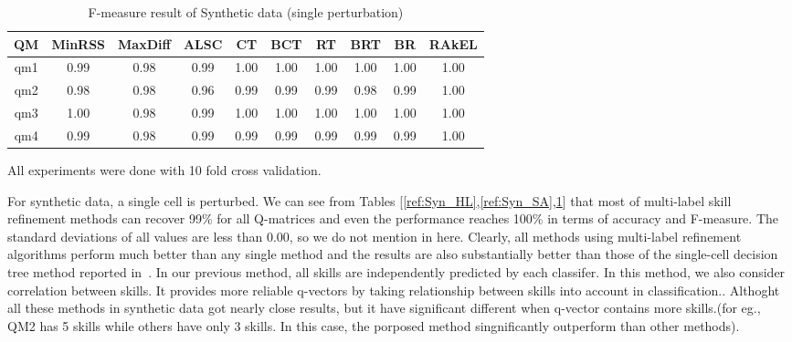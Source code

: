 \documentclass[11pt]{article}
\begin{document}
\begin {table}[h]
\scriptsize
\centering
\begin{tabular}{c|c|c|c|c|c|c|c|c|c}	
	\hline\hline	
QM & MinRSS & MaxDiff & ALSC & CT & BCT & RT & BRT & BR & RAkEL \\ \hline
qm1 & 0.99 & 0.98 & 0.99 & 1.00 & 1.00 & 1.00 & 1.00 & 1.00 & 1.00 \\
qm2 & 0.98 & 0.98 & 0.96 & 0.99 & 0.99 & 0.99 & 0.98 & 0.99 & 1.00 \\
qm3 & 1.00 & 0.98 & 0.99 & 1.00 & 1.00 & 1.00 & 1.00 & 1.00 & 1.00 \\
qm4 & 0.99 & 0.98 & 0.99 & 0.99 & 0.99 & 0.99 & 0.99 & 0.99 & 1.00 \\
\hline\hline
\end{tabular}
\caption {F-measure result of Synthetic data (single perturbation)} \label{ref:Syn_FM}
\end{table}

All experiments were done with 10 fold cross validation.

 
 For synthetic data, a single cell is perturbed. We can see from Tables [\ref{ref:Syn_HL},\ref{ref:Syn_SA},\ref{ref:Syn_FM}] that most of multi-label skill refinement methods can recover 99\% for all
Q-matrices and even the performance reaches 100\% in terms of accuracy
and F-measure. The standard deviations of all values are less than 0.00, so we do not mention in here. Clearly, all methods using multi-label refinement algorithms perform much better than any single method and the results are also substantially better than those of the single-cell decision tree method reported in~\cite{desmarais2015combining}. In our previous method, all skills are independently predicted by each classifer. In this method, we also consider correlation between skills. It provides more reliable q-vectors by taking relationship between skills into account in classification.. Althoght all these methods in synthetic data got nearly close results, but it have significant different when q-vector contains more skills.(for eg., QM2 has 5 skills while others have only 3 skills. In this case, the porposed method singnificantly outperform than other methods).
\end{document}
